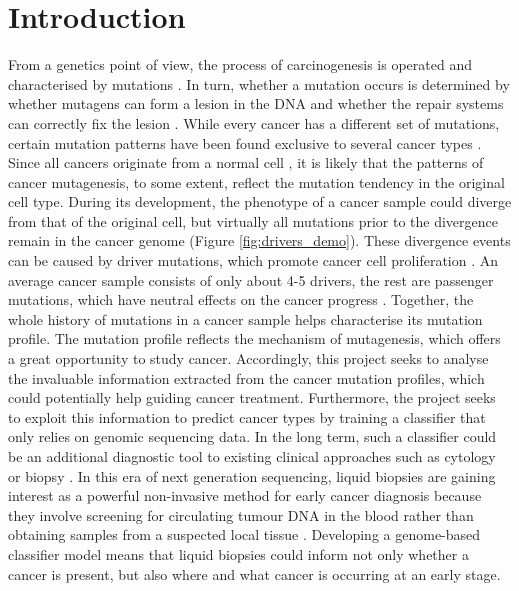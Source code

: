 \chapter{Introduction}\label{intro}

From a genetics point of view, the process of \gls{carcinogenesis} is operated and characterised by mutations \citep{Stratton2009}. In turn, whether a mutation occurs is determined by whether mutagens can form a \gls{lesion} in the DNA and whether the repair systems can correctly fix the lesion \citep{Chatterjee2017MechanismsMutagenesis}. While every cancer has a different set of mutations, certain mutation patterns have been found exclusive to several cancer types \citep{Alexandrov2013,Polak2015,Campbell2020}. Since all cancers originate from a normal cell \citep{Hanahan2011HallmarksGeneration}, it is likely that the patterns of cancer \gls{mutagenesis}, to some extent, reflect the mutation tendency in the original cell type. During its development, the phenotype of a cancer sample could diverge from that of the original cell, but virtually all mutations prior to the divergence remain in the cancer genome (Figure \ref{fig:drivers_demo}). These divergence events can be caused by driver mutations, which promote cancer cell proliferation \citep{Pon2015}. An average cancer sample consists of only about 4-5 drivers, the rest are passenger mutations, which have neutral effects on the cancer progress \citep{Campbell2020}. Together, the whole history of mutations in a cancer sample helps characterise its mutation profile. The mutation profile reflects the mechanism of mutagenesis, which offers a great opportunity to study cancer. Accordingly, this project seeks to analyse the invaluable information extracted from the cancer mutation profiles, which could potentially help guiding cancer treatment. Furthermore, the project seeks to exploit this information to predict cancer types by training a \gls{classifier} that only relies on genomic sequencing data. In the long term, such a classifier could be an additional diagnostic tool to existing clinical approaches such as cytology or biopsy \citep{Stone1995Biopsy:Pitfalls}. In this era of next generation sequencing, liquid biopsies are gaining interest as a powerful non-invasive method for early cancer diagnosis because they involve screening for circulating tumour DNA in the blood rather than obtaining samples from a suspected local tissue \citep{Chen2019Next-generationDetection}. Developing a genome-based classifier model means that liquid biopsies could inform not only whether a cancer is present, but also where and what cancer is occurring at an early stage.  

